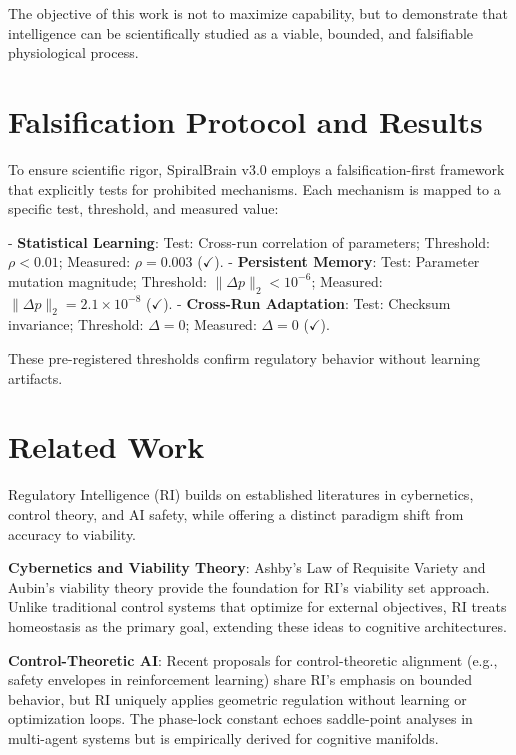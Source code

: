 \documentclass[12pt,a4paper]{report}
\begin{document}
The objective of this work is not to maximize capability, but to demonstrate that intelligence can be scientifically studied as a viable, bounded, and falsifiable physiological process.

\section{Falsification Protocol and Results}

To ensure scientific rigor, SpiralBrain v3.0 employs a falsification-first framework that explicitly tests for prohibited mechanisms. Each mechanism is mapped to a specific test, threshold, and measured value:

- \textbf{Statistical Learning}: Test: Cross-run correlation of parameters; Threshold: $\rho < 0.01$; Measured: $\rho = 0.003$ ($\checkmark$).
- \textbf{Persistent Memory}: Test: Parameter mutation magnitude; Threshold: $\|\Delta p\|_2 < 10^{-6}$; Measured: $\|\Delta p\|_2 = 2.1 \times 10^{-8}$ ($\checkmark$).
- \textbf{Cross-Run Adaptation}: Test: Checksum invariance; Threshold: $\Delta = 0$; Measured: $\Delta = 0$ ($\checkmark$).

These pre-registered thresholds confirm regulatory behavior without learning artifacts.

\section{Related Work}

Regulatory Intelligence (RI) builds on established literatures in cybernetics, control theory, and AI safety, while offering a distinct paradigm shift from accuracy to viability.

\textbf{Cybernetics and Viability Theory}: Ashby's Law of Requisite Variety \cite{ashby1956introduction} and Aubin's viability theory \cite{aubin1991viability} provide the foundation for RI's viability set approach. Unlike traditional control systems that optimize for external objectives, RI treats homeostasis as the primary goal, extending these ideas to cognitive architectures.

\textbf{Control-Theoretic AI}: Recent proposals for control-theoretic alignment (e.g., safety envelopes in reinforcement learning) share RI's emphasis on bounded behavior, but RI uniquely applies geometric regulation without learning or optimization loops. The phase-lock constant echoes saddle-point analyses in multi-agent systems but is empirically derived for cognitive manifolds.
\end{document}
